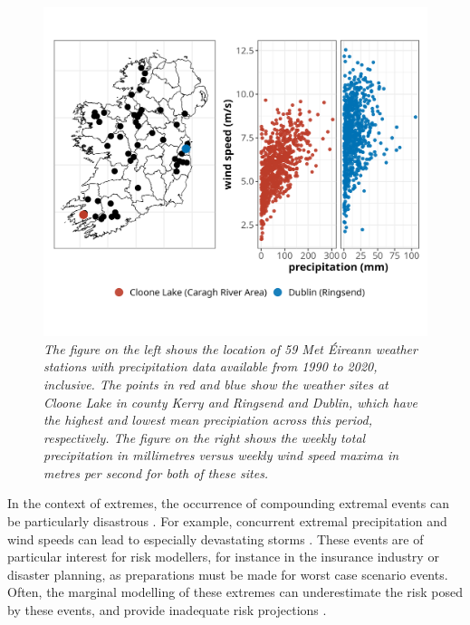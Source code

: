 \documentclass{article}
\numberwithin{equation}{section}
\begin{document}
\begin{figure}[H]
    \centering
    \includegraphics[width = 0.9\linewidth]{plots/02_mot_ex_plot.png}
    \caption{\emph{The figure on the left shows the location of 59 Met Éireann weather stations with precipitation data available from 1990 to 2020, inclusive. The points in red and blue show the weather sites at Cloone Lake in county Kerry and Ringsend and Dublin, which have the highest and lowest mean precipiation across this period, respectively. The figure on the right shows the weekly total precipitation in millimetres versus weekly wind speed maxima in metres per second for both of these sites.}}
    \label{fig:02_locs}
\end{figure}

In the context of extremes, the occurrence of compounding extremal events can be particularly disastrous \citet{Vignotto2021, Leonard2014}.
For example, concurrent extremal precipitation and wind speeds can lead to especially devastating storms \citet{Martius2016}.
These events are of particular interest for risk modellers, for instance in the insurance industry or disaster planning, as preparations must be made for worst case scenario events.
Often, the marginal modelling of these extremes can underestimate the risk posed by these events, and provide inadequate risk projections \citet{Zscheischler2017}.
\end{document}
